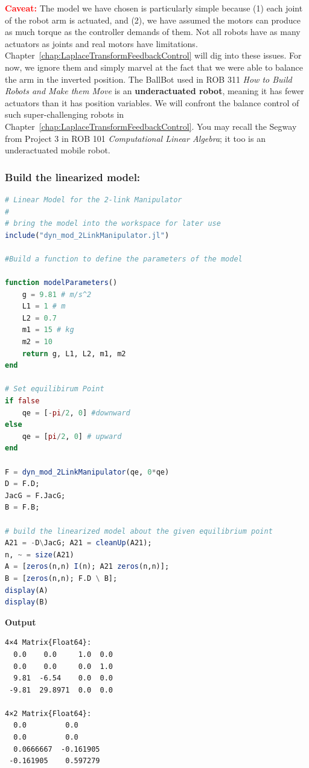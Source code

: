  \textcolor{red}{\bf Caveat:} The model we have chosen is particularly simple because (1) each joint of the robot arm is actuated, and (2), we have assumed the motors can produce as much torque as the controller demands of them. Not all robots have as many actuators as joints and real motors have limitations. Chapter~\ref{chap:LaplaceTransformFeedbackControl} will dig into these issues. For now, we ignore them and simply marvel at the fact that we were able to balance the arm in the inverted position. The BallBot used in ROB 311 \textit{How to Build Robots and Make them Move} is an \textbf{underactuated robot}, meaning it has fewer actuators than it has position variables. We will confront the balance control of such super-challenging robots in Chapter~\ref{chap:LaplaceTransformFeedbackControl}. You may recall the Segway from Project 3 in ROB 101 \textit{Computational Linear Algebra}; it too is an underactuated mobile robot.

  \bigskip

  \subsubsection{Build the linearized model:}
\begin{lstlisting}[language=Julia,style=mystyle]
# Linear Model for the 2-link Manipulator
#
# bring the model into the workspace for later use
include("dyn_mod_2LinkManipulator.jl") 

#Build a function to define the parameters of the model

function modelParameters()
    g = 9.81 # m/s^2
    L1 = 1 # m
    L2 = 0.7
    m1 = 15 # kg
    m2 = 10   
    return g, L1, L2, m1, m2
end

# Set equilibirum Point
if false
    qe = [-pi/2, 0] #downward
else
    qe = [pi/2, 0] # upward
end

F = dyn_mod_2LinkManipulator(qe, 0*qe)
D = F.D; 
JacG = F.JacG; 
B = F.B; 

# build the linearized model about the given equilibrium point
A21 = -D\JacG; A21 = cleanUp(A21); 
n, ~ = size(A21)
A = [zeros(n,n) I(n); A21 zeros(n,n)];
B = [zeros(n,n); F.D \ B];
display(A)
display(B)
\end{lstlisting}
\textbf{Output} 
\begin{verbatim}
4×4 Matrix{Float64}:
  0.0    0.0     1.0  0.0
  0.0    0.0     0.0  1.0
  9.81  -6.54    0.0  0.0
 -9.81  29.8971  0.0  0.0
 
4×2 Matrix{Float64}:
  0.0         0.0
  0.0         0.0
  0.0666667  -0.161905
 -0.161905    0.597279
\end{verbatim}

